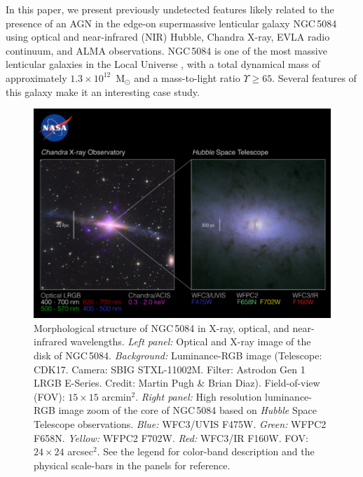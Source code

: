 \documentclass[modern]{CORE-AAS/aastex631}
\begin{document}
In this paper, we present previously undetected features likely related to the presence of an AGN in the edge-on supermassive lenticular galaxy NGC\,5084 \citep[$\alpha=200\fdg0705$, $\delta=-21\fdg8276$ ICRS, $D=	29.9\pm2.1$~Mpc, $z=0.005741$, 6.90~arcsec~kpc$^{-1}$,][Fig.\,\ref{fig:NGC5084_poster}]{gottesman+1986mnras219_759, devaucouleurs+1991book, koribalski+2004aj128_16} using optical and near-infrared (NIR) Hubble, Chandra X-ray, EVLA radio continuum, and ALMA observations. 
NGC\,5084 is one of the most massive lenticular galaxies in the Local Universe \citep[]{ohlson+2024aj167_31}, with a total dynamical mass of approximately $1.3\times10^{12}$~M$_{\odot}$ \citep{koribalski+2004aj128_16} and a mass-to-light ratio $\Upsilon \geq 65$. Several features of this galaxy make it an interesting case study.
\begin{figure}[t!]
\begin{center}
\includegraphics[trim={0 10 0 100}, clip, width=\textwidth]{FIGURES/Composition_NGC5084_poster_v6_paper.png}
\caption{Morphological structure of NGC\,5084 in X-ray, optical, and near-infrared wavelengths. \emph{Left panel:} Optical and X-ray image of 
the disk of NGC\,5084. \emph{Background:} Luminance-RGB image (Telescope: CDK17. Camera: SBIG STXL-11002M. Filter: Astrodon Gen 1 LRGB E-Series. Credit: Martin Pugh \& Brian Diaz). Field-of-view (FOV): $15\times15$ arcmin$^{2}$. \emph{Right panel:} High resolution luminance-RGB image zoom of the core of NGC\,5084 based on \emph{Hubble} Space Telescope observations. \emph{Blue:} WFC3/UVIS F475W. \emph{Green:} WFPC2 F658N. \emph{Yellow:} WFPC2 F702W. \emph{Red:} WFC3/IR F160W.  FOV: $24\times24$ arcsec$^{2}$. See the legend for color-band description and the physical scale-bars in the panels for reference.} 
\label{fig:NGC5084_poster}
\end{center}
\end{figure}
\end{document}
